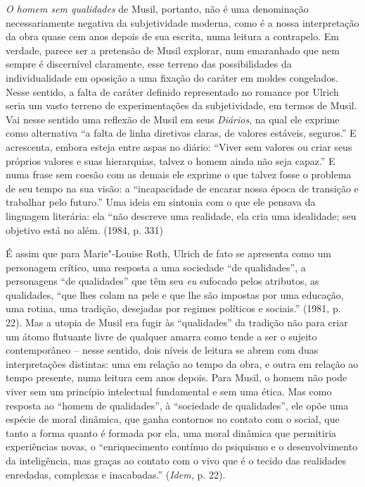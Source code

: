 \emph{O homem sem qualidades} de Musil, portanto, não é uma denominação
necessariamente negativa da subjetividade moderna, como é a nossa
interpretação da obra quase cem anos depois de sua escrita, numa leitura
a contrapelo. Em verdade, parece ser a pretensão de Musil explorar, num
emaranhado que nem sempre é discernível claramente, esse terreno das
possibilidades da individualidade em oposição a uma fixação do caráter
em moldes congelados. Nesse sentido, a falta de caráter definido
representado no romance por Ulrich seria um vasto terreno de
experimentações da subjetividade, em termos de Musil. Vai nesse sentido
uma reflexão de Musil em seus \emph{Diários}, na qual ele exprime como
alternativa ``a falta de linha diretivas claras, de valores estáveis,
seguros.'' E acrescenta, embora esteja entre aspas no diário: ``Viver
sem valores ou criar seus próprios valores e suas hierarquias, talvez o
homem ainda não seja capaz.'' E numa frase sem coesão com as demais ele
exprime o que talvez fosse o problema de seu tempo na sua visão: a
``incapacidade de encarar nossa época de transição e trabalhar pelo
futuro.'' Uma ideia em sintonia com o que ele pensava da linguagem
literária: ela ``não descreve uma realidade, ela cria uma idealidade;
seu objetivo está no além. (1984, p. 331)

É assim que para Marie"-Louise Roth, Ulrich de fato se apresenta como um
personagem crítico, uma resposta a uma sociedade ``de qualidades'', a
personagens ``de qualidades'' que têm seu \emph{eu} sufocado pelos
atributos, as qualidades, ``que lhes colam na pele e que lhe são
impostas por uma educação, uma rotina, uma tradição, desejadas por
regimes políticos e sociais.'' (1981, p. 22). Mas a utopia de Musil era
fugir às ``qualidades'' da tradição não para criar um átomo flutuante
livre de qualquer amarra como tende a ser o sujeito contemporâneo --
nesse sentido, dois níveis de leitura se abrem com duas interpretações
distintas: uma em relação ao tempo da obra, e outra em relação ao tempo
presente, numa leitura cem anos depois. Para Musil, o homem não pode
viver sem um princípio intelectual fundamental e sem uma ética. Mas como
resposta ao ``homem de qualidades'', à ``sociedade de qualidades'', ele
opõe uma espécie de moral dinâmica, que ganha contornos no contato com o
social, que tanto a forma quanto é formada por ela, uma moral dinâmica
que permitiria experiências novas, o ``enriquecimento contínuo do
psiquismo e o desenvolvimento da inteligência, mas graças ao contato com
o vivo que é o tecido das realidades enredadas, complexas e
inacabadas.'' (\emph{Idem,} p. 22).

